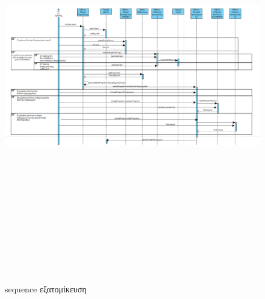 \begin{figure}[!htb]
  \centering
    \centering
    \includegraphics[width=\textwidth,height=18cm]{sequence_eksatom.png}
    \caption{sequence εξατομίκευση}
    \label{}
\end{figure}
